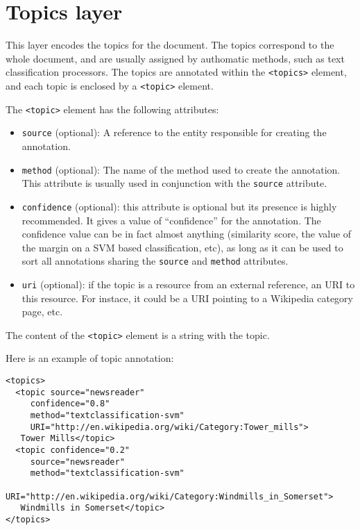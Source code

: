 
\section{Topics layer}
\label{sec:topics-layer}

This layer encodes the topics for the document. The topics correspond
to the whole document, and are usually assigned by authomatic methods,
such as text classification processors. The topics are annotated
within the \texttt{<topics>} element, and each topic is enclosed by a
\texttt{<topic>} element.

The \texttt{<topic>} element has the following attributes:
\begin{itemize}
\item \texttt{source} (optional): A reference to the entity
  responsible for creating the annotation.
\item \texttt{method} (optional): The name of the method used to
  create the annotation. This attribute is usually used in conjunction
  with the \texttt{source} attribute.
\item \texttt{confidence} (optional): this attribute is optional but
  its presence is highly recommended. It gives a value of
  ``confidence'' for the annotation. The confidence value can be in
  fact almost anything (similarity score, the value of the margin on a
  SVM based classification, etc), as long as it can be used to sort
  all annotations sharing the \texttt{source} and \texttt{method}
  attributes.
\item \texttt{uri} (optional): if the topic is a resource
  from an external reference, an URI to this resource. For instace, it
  could be a URI pointing to a Wikipedia category page, etc.
\end{itemize}

The content of the \texttt{<topic>} element is a string with the
topic.

Here is an example of topic annotation:

\begin{Verbatim}
<topics>
  <topic source="newsreader"
	 confidence="0.8"
	 method="textclassification-svm"
	 URI="http://en.wikipedia.org/wiki/Category:Tower_mills">
   Tower Mills</topic>
  <topic confidence="0.2"
	 source="newsreader"
	 method="textclassification-svm"
	 URI="http://en.wikipedia.org/wiki/Category:Windmills_in_Somerset">
   Windmills in Somerset</topic>
</topics>
\end{Verbatim}


